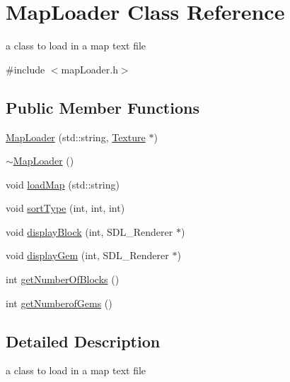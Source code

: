 \hypertarget{class_map_loader}{\section{Map\+Loader Class Reference}
\label{class_map_loader}
}


a class to load in a map text file  




{\ttfamily \#include $<$map\+Loader.\+h$>$}

\subsection*{Public Member Functions}
\begin{DoxyCompactItemize}
\item 
\hyperlink{class_map_loader_af1d603fadc9c969743d6373320f1a75b}{Map\+Loader} (std\+::string, \hyperlink{class_texture}{Texture} $\ast$)
\item 
\hyperlink{class_map_loader_a6055310649b9a926301d7fb2b83cb1b1}{$\sim$\+Map\+Loader} ()
\item 
void \hyperlink{class_map_loader_a2b11906f78b6be764323675435457d70}{load\+Map} (std\+::string)
\item 
void \hyperlink{class_map_loader_a809870094c738af7aac61041850777dd}{sort\+Type} (int, int, int)
\item 
void \hyperlink{class_map_loader_a0430f4acdbe19fd6853a61e3b9f71543}{display\+Block} (int, S\+D\+L\+\_\+\+Renderer $\ast$)
\item 
void \hyperlink{class_map_loader_adf524d17cab14e1096341100abfe92b2}{display\+Gem} (int, S\+D\+L\+\_\+\+Renderer $\ast$)
\item 
int \hyperlink{class_map_loader_a178ca855ceec126f0a3a2264b74f63cc}{get\+Number\+Of\+Blocks} ()
\item 
int \hyperlink{class_map_loader_a026a7c38e03cdee9a355b09ca6048daa}{get\+Numberof\+Gems} ()
\end{DoxyCompactItemize}


\subsection{Detailed Description}
a class to load in a map text file 

